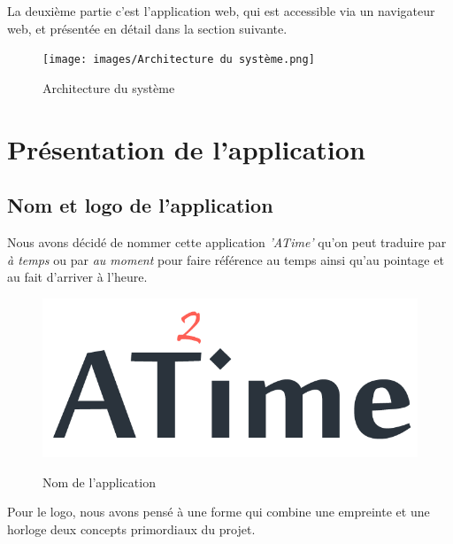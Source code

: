 La deuxième partie c’est l’application web, qui est accessible via un navigateur
web, et présentée en détail dans la section suivante.

\vspace{10pt}
\begin{figure}[h!]
    \centering
    \texttt{[image: images/Architecture du système.png]}
    \label{fig84}
    \caption{Architecture du système}
    \label{figUFE}
\end{figure} 

\clearpage        
\section{Présentation de l'application}

\subsection{Nom et logo de l'application}
Nous avons décidé de nommer cette application \emph{'ATime'} qu’on peut traduire
par \emph{à temps} ou par \emph{au moment} pour faire référence au temps ainsi
qu’au pointage et au fait d'arriver à l'heure.

\begin{figure}[h!]
    \centering
    \includegraphics[scale=0.4 ]{images/app_name_dark.png}
    \label{fig85}
    \caption{Nom de l'application}
    \label{}
\end{figure} 

Pour le logo, nous avons pensé à une forme qui combine une empreinte et une 
horloge deux concepts primordiaux du projet.

